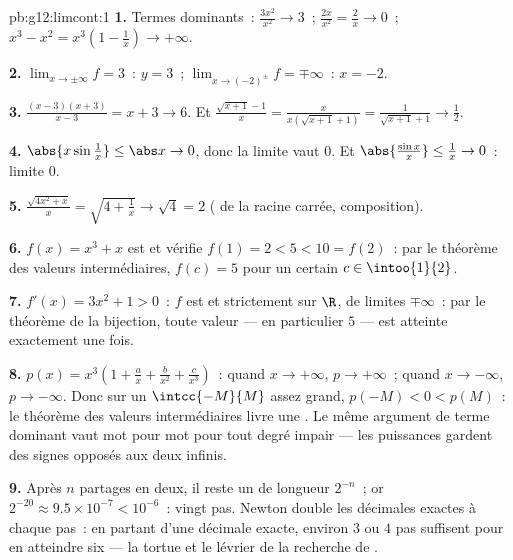\begin{solution}{pb:g12:limcont:1}
\textbf{1.} Termes dominants~: $\frac{3x^2}{x^2} \to 3$~;
$\frac{2x}{x^2} = \frac2x \to 0$~;
$x^3 - x^2 = x^3\left(1 - \frac1x\right) \to +\infty$.

\textbf{2.} $\lim_{x \to \pm\infty} f = 3$~: 
$y = 3$~; $\lim_{x \to (-2)^\pm} f = \mp\infty$~:  $x = -2$.

\textbf{3.} $\frac{(x-3)(x+3)}{x - 3} = x + 3 \to 6$. Et
$\frac{\sqrt{x+1} - 1}{x} = \frac{x}{x(\sqrt{x+1} + 1)} =
\frac{1}{\sqrt{x+1} + 1} \to \frac12$.

\textbf{4.} $\abs{x \sin\frac1x} \leq \abs x \to 0$, donc la limite
vaut $0$. Et $\abs{\frac{\sin x}{x}} \leq \frac1x \to 0$~: limite
$0$.

\textbf{5.} $\frac{\sqrt{4x^2 + x}}{x} =
\sqrt{4 + \frac1x} \to \sqrt4 = 2$ ( de la racine carrée,
composition).

\textbf{6.} $f(x) = x^3 + x$ est  et vérifie
$f(1) = 2 < 5 < 10 = f(2)$~: par le théorème des valeurs
intermédiaires, $f(c) = 5$ pour un certain $c \in \intoo{1}{2}$.

\textbf{7.} $f'(x) = 3x^2 + 1 > 0$~: $f$ est  et
strictement  sur $\R$, de limites $\mp\infty$~: par le
théorème de la bijection, toute valeur --- en particulier $5$ ---
est atteinte exactement une fois.

\textbf{8.} $p(x) = x^3\left(1 + \frac ax + \frac{b}{x^2} +
\frac{c}{x^3}\right)$~: quand $x \to +\infty$, $p \to +\infty$~;
quand $x \to -\infty$, $p \to -\infty$. Donc sur un 
$\intcc{-M}{M}$ assez grand, $p(-M) < 0 < p(M)$~: le théorème des
valeurs intermédiaires livre une . Le même argument de terme
dominant vaut mot pour mot pour tout degré impair --- les puissances
 gardent des signes opposés aux deux infinis.

\textbf{9.} Après $n$ partages en deux, il reste un  de
longueur $2^{-n}$~; or $2^{-20} \approx 9.5 \times 10^{-7} <
10^{-6}$~: vingt pas. Newton double les décimales exactes à chaque
pas~: en partant d'une décimale exacte, environ $3$ ou $4$ pas
suffisent pour en atteindre six --- la tortue et le lévrier de la
recherche de .


\end{solution}
